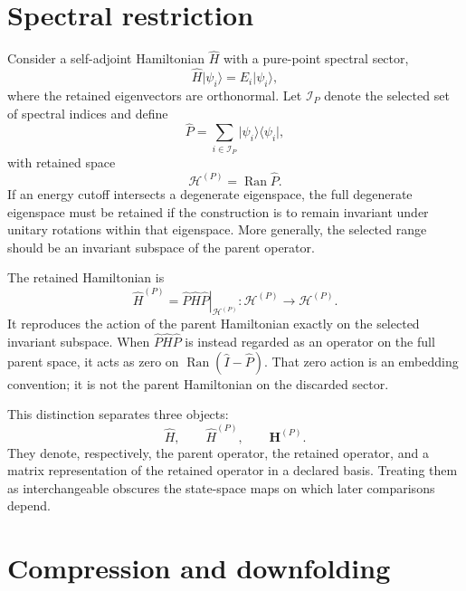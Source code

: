 \section*{Spectral restriction}

Consider a self-adjoint Hamiltonian $\hat H$ with a pure-point spectral sector,
\begin{equation}
    \hat H\lvert\psi_i\rangle
    =
    E_i\lvert\psi_i\rangle,
\end{equation}
where the retained eigenvectors are orthonormal. Let $\mathcal I_P$ denote the
selected set of spectral indices and define
\begin{equation}
    \hat P
    =
    \sum_{i\in\mathcal I_P}
    \lvert\psi_i\rangle\langle\psi_i\rvert,
\end{equation}
with retained space
\begin{equation}
    \mathcal H^{(P)}
    =
    \operatorname{Ran}\hat P.
\end{equation}
If an energy cutoff intersects a degenerate eigenspace, the full degenerate
eigenspace must be retained if the construction is to remain invariant under
unitary rotations within that eigenspace. More generally, the selected range
should be an invariant subspace of the parent operator.

The retained Hamiltonian is
\begin{equation}
    \hat H^{(P)}
    =
    \left.
        \hat P\hat H\hat P
    \right|_{\mathcal H^{(P)}}:
    \mathcal H^{(P)}
    \longrightarrow
    \mathcal H^{(P)}.
\end{equation}
It reproduces the action of the parent Hamiltonian exactly on the selected
invariant subspace. When $\hat P\hat H\hat P$ is instead regarded as an
operator on the full parent space, it acts as zero on
$\operatorname{Ran}(\hat I-\hat P)$. That zero action is an embedding
convention; it is not the parent Hamiltonian on the discarded sector.

This distinction separates three objects:
\begin{equation}
    \hat H,
    \qquad
    \hat H^{(P)},
    \qquad
    \mathbf H^{(P)}.
\end{equation}
They denote, respectively, the parent operator, the retained operator, and a
matrix representation of the retained operator in a declared basis. Treating
them as interchangeable obscures the state-space maps on which later
comparisons depend.

\section*{Compression and downfolding}

